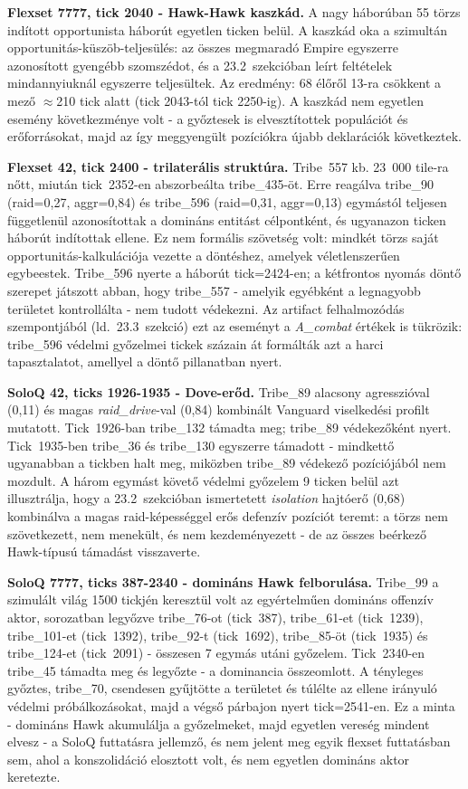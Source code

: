 \textbf{Flexset 7777, tick 2040 - Hawk-Hawk kaszkád.}
A nagy háborúban 55 törzs indított opportunista háborút egyetlen ticken belül.
A kaszkád oka a szimultán opportunitás-küszöb-teljesülés: az összes megmaradó Empire
egyszerre azonosított gyengébb szomszédot, és a 23.2~szekcióban leírt feltételek
mindannyiuknál egyszerre teljesültek. Az eredmény: 68 élőről 13-ra csökkent a mező
$\approx$210 tick alatt (tick 2043-tól tick 2250-ig). A kaszkád nem egyetlen esemény
következménye volt - a győztesek is elvesztítottek populációt és erőforrásokat,
majd az így meggyengült pozíciókra újabb deklarációk következtek.

\textbf{Flexset 42, tick 2400 - trilaterális struktúra.}
Tribe~557 kb. 23~000 tile-ra nőtt, miután tick~2352-en abszorbeálta tribe\_435-öt.
Erre reagálva tribe\_90 (raid=0{,}27, aggr=0{,}84) és tribe\_596 (raid=0{,}31,
aggr=0{,}13) egymástól teljesen függetlenül azonosítottak a domináns entitást
célpontként, és ugyanazon ticken háborút indítottak ellene.
Ez nem formális szövetség volt: mindkét törzs saját opportunitás-kalkulációja
vezette a döntéshez, amelyek véletlenszerűen egybeestek.
Tribe\_596 nyerte a háborút tick=2424-en; a kétfrontos nyomás döntő szerepet
játszott abban, hogy tribe\_557 - amelyik egyébként a legnagyobb területet kontrollálta -
nem tudott védekezni. Az artifact felhalmozódás szempontjából (ld.~23.3~szekció)
ezt az eseményt a \textit{A\_combat} értékek is tükrözik: tribe\_596 védelmi
győzelmei tickek százain át formálták azt a harci tapasztalatot, amellyel a
döntő pillanatban nyert.

\textbf{SoloQ 42, ticks 1926-1935 - Dove-erőd.}
Tribe\_89 alacsony agresszióval (0{,}11) és magas \textit{raid\_drive}-val (0{,}84)
kombinált Vanguard viselkedési profilt mutatott. Tick~1926-ban tribe\_132 támadta meg;
tribe\_89 védekezőként nyert. Tick~1935-ben tribe\_36 és tribe\_130 egyszerre támadott -
mindkettő ugyanabban a tickben halt meg, miközben tribe\_89 védekező pozíciójából
nem mozdult. A három egymást követő védelmi győzelem 9 ticken belül azt illusztrálja,
hogy a 23.2~szekcióban ismertetett \textit{isolation} hajtóerő (0{,}68)
kombinálva a magas raid-képességgel erős defenzív pozíciót teremt: a törzs nem
szövetkezett, nem menekült, és nem kezdeményezett - de az összes beérkező Hawk-típusú
támadást visszaverte.

\textbf{SoloQ 7777, ticks 387-2340 - domináns Hawk felborulása.}
Tribe\_99 a szimulált világ 1500 tickjén keresztül volt az egyértelműen domináns
offenzív aktor, sorozatban legyőzve tribe\_76-ot (tick~387), tribe\_61-et (tick~1239),
tribe\_101-et (tick~1392), tribe\_92-t (tick~1692), tribe\_85-öt (tick~1935) és
tribe\_124-et (tick~2091) - összesen 7 egymás utáni győzelem.
Tick~2340-en tribe\_45 támadta meg és legyőzte - a dominancia összeomlott.
A tényleges győztes, tribe\_70, csendesen gyűjtötte a területet és túlélte az
ellene irányuló védelmi próbálkozásokat, majd a végső párbajon nyert tick=2541-en.
Ez a minta - domináns Hawk akumulálja a győzelmeket, majd egyetlen vereség mindent
elvesz - a SoloQ futtatásra jellemző, és nem jelent meg egyik flexset futtatásban sem,
ahol a konszolidáció elosztott volt, és nem egyetlen domináns aktor keretezte.

